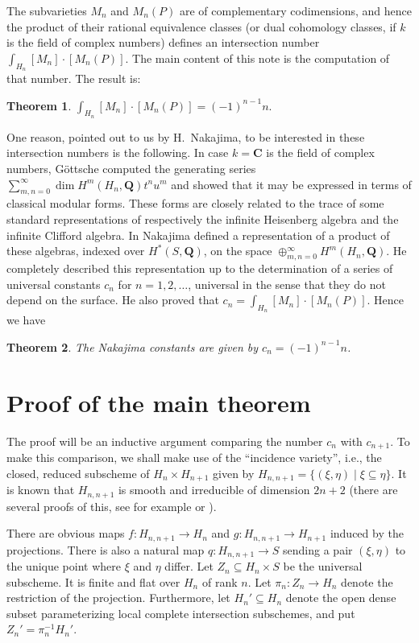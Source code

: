 \documentclass[12pt]{amsart}
\def\Hn{H_n}
\def\Hnn{H_{n,n+1}}
\def\Hnp{H_{n+1}}
\let\:=\colon
\def\i{^{-1}}
\def\CC{{\mathbf C}}
\def\QQ{{\mathbf Q}}
\def\sub{\subseteq}
\newtheorem{thm}{Theorem}[section]
\theoremstyle{definition}
\theoremstyle{remark}
\numberwithin{equation}{section}
\begin{document}
The subvarieties $M_n$ and $M_n(P)$ are of complementary codimensions,
and hence the product of their rational equivalence classes (or dual
cohomology classes, if $k$ is the field of complex numbers) defines an
intersection number $\int_{\Hn}^{}[M_n]\cdot [M_n(P)]$. The main content
of this note is the computation of that number. The result is:

\begin{thm}\label{main}
  $\int_{\Hn}^{}[M_n]\cdot[M_n(P)]=(-1)^{n-1}n.$
\end{thm}


One reason, pointed out to us by H.~Nakajima, to be interested in these
intersection numbers is the following.  In case $k=\CC$ is the field
of complex numbers, G\"ottsche \cite{Goet1} computed the generating
series $ \sum_{m,n=0}^{\infty}\dim H^m(\Hn,\QQ)t^n u^m $ and showed
that it may be expressed in terms of classical modular forms. These
forms are closely related to the trace of some standard
representations of respectively the infinite Heisenberg algebra and
the infinite Clifford algebra.  In \cite{Naka} Nakajima defined a
representation of a product of these algebras, indexed over
$H^{*}(S,\QQ)$, on the space $\oplus_{m,n=0}^{\infty}H^{m}(\Hn,\QQ)$.
He completely described this representation up to the determination of
a series of universal constants $c_n$ for $n=1,2,\ldots$, universal in
the sense that they do not depend on the surface.  He also proved that
$c_n=\int_{\Hn}^{}[M_n]\cdot[M_n(P)]$. Hence we have

 \begin{thm}\label{NakaTheo}
   The Nakajima constants are given by $c_n=(-1)^{n-1}n$.
 \end{thm}


\section{Proof of the main theorem}

The proof will be an inductive argument comparing the number $c_n$
with $c_{n+1}$.  To make this comparison, we shall make use of the
``incidence variety'', i.e., the closed, reduced subscheme of
$\Hn\times \Hnp$ given by $\Hnn=\{(\xi,\eta)\mid \xi\sub \eta \}$.  It
is known that $\Hnn$ is smooth and irreducible of dimension $2n+2$
(there are several proofs of this, see for example \cite{Chea-1} or
\cite{Tikh-2}).

There are obvious maps $f\:\Hnn\to \Hn$ and $g\:\Hnn\to \Hnp$ induced
by the projections.  There is also a natural map $q\:\Hnn\to S$
sending a pair $(\xi,\eta)$ to the unique point where $\xi$ and $\eta$
differ.  Let $Z_n\sub \Hn\times S$ be the universal subscheme. It is
finite and flat over $\Hn$ of rank $n$.  Let $\pi_n\:Z_n\to \Hn $
denote the restriction of the projection. Furthermore, let
$\Hn'\sub\Hn$ denote the open dense subset parameterizing local
complete intersection subschemes, and put $Z_n'=\pi_n\i \Hn'$.
\end{document}
